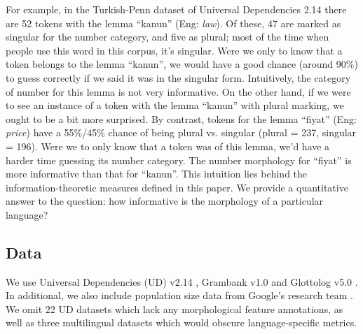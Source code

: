 \documentclass[USenglish]{article}
\begin{document}
For example, in the Turkish-Penn dataset of Universal Dependencies 2.14 there are 52 tokens with the lemma ``kanun'' (Eng: \textit{law}).
Of these, 47 are marked as singular for the number category, and five as plural; most of the time when people use this word in this corpus, it's singular.
Were we only to know that a token belongs to the lemma ``kanun'', we would have a good chance (around 90\%) to guess correctly if we said it was in the singular form.
Intuitively, the category of number for this lemma is not very informative.
On the other hand, if we were to see an instance of a token with the lemma ``kanun'' with plural marking, we ought to be a bit more surprised.
By contrast, tokens for the lemma ``fiyat'' (Eng: \textit{price}) have a 55\%/45\% chance of being plural vs. singular (plural = 237, singular = 196). 
Were we to only know that a token was of this lemma, we'd have a harder time guessing its number category. 
The number morphology for ``fiyat'' is more informative than that for ``kanun''.
This intuition lies behind the information-theoretic measures defined in this paper.
We provide a quantitative answer to the question: how informative is the morphology of a particular language?

\subsection{Data}
We use Universal Dependencies (UD) v2.14 \citep{UD_2.14}, Grambank v1.0 \citep{grambank_release, grambank_dataset_zenodo_v1} and Glottolog v5.0 \citep{glottolog5.0}. In additional, we also include population size data from Google's research team \citep{ritchie-etal-2024-linguameta-unified}.
We omit 22 UD datasets which lack any morphological feature annotations, as well as three multilingual datasets which would obscure language-specific metrics.
\end{document}
